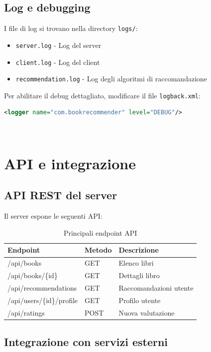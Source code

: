\documentclass[12pt,a4paper]{article}
\begin{document}
\subsection{Log e debugging}

I file di log si trovano nella directory \texttt{logs/}:

\begin{itemize}
    \item \texttt{server.log} - Log del server
    \item \texttt{client.log} - Log del client
    \item \texttt{recommendation.log} - Log degli algoritmi di raccomandazione
\end{itemize}

Per abilitare il debug dettagliato, modificare il file \texttt{logback.xml}:

\begin{lstlisting}[language=xml]
<logger name="com.bookrecommender" level="DEBUG"/>
\end{lstlisting}
\
\
\
\section{API e integrazione}

\subsection{API REST del server}

Il server espone le seguenti API:

\begin{table}[h]
\centering
\begin{tabular}{@{}lll@{}}
\toprule
Endpoint & Metodo & Descrizione \\ \midrule
/api/books & GET & Elenco libri \\
/api/books/\{id\} & GET & Dettagli libro \\
/api/recommendations & GET & Raccomandazioni utente \\
/api/users/\{id\}/profile & GET & Profilo utente \\
/api/ratings & POST & Nuova valutazione \\ \bottomrule
\end{tabular}
\caption{Principali endpoint API}\label{tab:table}
\end{table}

\subsection{Integrazione con servizi esterni}
\end{document}
